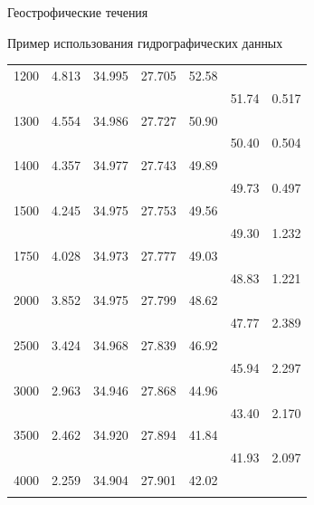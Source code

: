 \begin{chapter}{Геострофические течения}
\begin{section}{Пример использования гидрографических данных}
\begin{table}[t!]
\begin{small}
\begin{center}
\begin{tabular}{rrrrrrl}
1200&   4.813&  34.995& 27.705& 52.58&  \\
 &            &       &       &       & 51.74&  0.517\\
1300&   4.554&  34.986& 27.727& 50.90&  \\
 &            &       &       &       & 50.40&  0.504\\
1400&   4.357&  34.977& 27.743& 49.89&  \\
 &            &       &       &       & 49.73&  0.497\\
1500&   4.245&  34.975& 27.753& 49.56&  \\
 &            &       &       &       & 49.30&  1.232\\
1750&   4.028&  34.973& 27.777& 49.03&  \\
 &            &       &       &       & 48.83&  1.221\\
2000&   3.852&  34.975& 27.799& 48.62&  \\
 &            &       &       &       & 47.77&  2.389\\
2500&   3.424&  34.968& 27.839& 46.92&  \\
 &            &       &       &       & 45.94&  2.297\\
3000&   2.963&  34.946& 27.868& 44.96&  \\
 &            &       &       &       & 43.40&  2.170\\
3500&   2.462&  34.920& 27.894& 41.84&  \\
 &            &       &       &       & 41.93&  2.097\\
4000&   2.259&  34.904& 27.901& 42.02 \\
\rule[-1ex]{0mm}{1ex}&  \\
\hline
\end{tabular} \\
\end{center}
\end{small}
\end{table}


\end{section}
\end{chapter}
